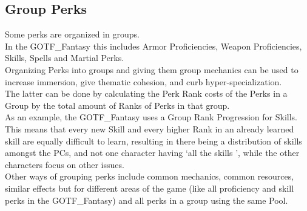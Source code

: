 \subsection{Group Perks}\label{subsec:groupperks}
Some perks are organized in groups.\\
In the GOTF\_Fantasy this includes Armor Proficiencies, Weapon Proficiencies, Skills, Spells and Martial Perks.\\
Organizing Perks into groups and giving them group mechanics can be used to increase immersion, give thematic cohesion, and curb hyper-specialization.\\
The latter can be done by calculating the Perk Rank costs of the Perks in a Group by the total amount of Ranks of Perks in that group.\\
As an example, the GOTF\_Fantasy uses a Group Rank Progression for Skills.
This means that every new Skill and every higher Rank in an already learned skill are equally difficult to learn, resulting in there being a distribution of skills amongst the PCs, and not one character having \lq all the skills \rq, while the other characters focus on other issues.\\
Other ways of grouping perks include common mechanics, common resources, similar effects but for different areas of the game (like all proficiency and skill perks in the GOTF\_Fantasy) and all perks in a group using the same Pool.\\

